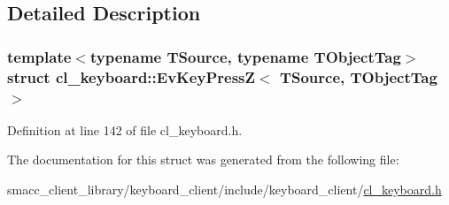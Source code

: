 \subsection{Detailed Description}
\subsubsection*{template$<$typename T\+Source, typename T\+Object\+Tag$>$\newline
struct cl\+\_\+keyboard\+::\+Ev\+Key\+Press\+Z$<$ T\+Source, T\+Object\+Tag $>$}



Definition at line 142 of file cl\+\_\+keyboard.\+h.



The documentation for this struct was generated from the following file\+:\begin{DoxyCompactItemize}
\item 
smacc\+\_\+client\+\_\+library/keyboard\+\_\+client/include/keyboard\+\_\+client/\hyperlink{cl__keyboard_8h}{cl\+\_\+keyboard.\+h}\end{DoxyCompactItemize}
